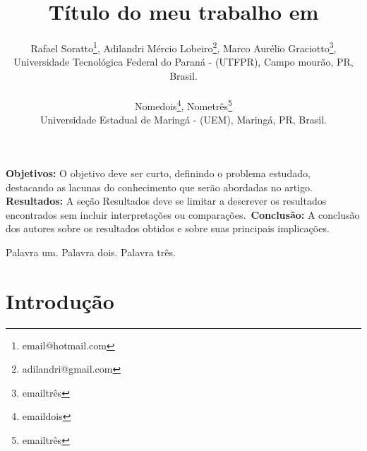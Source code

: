 \documentclass[a4,12pt]{modelo}
\newcommand{\objetivos}{O objetivo deve ser curto, definindo o problema estudado, destacando as lacunas do conhecimento que serão abordadas no artigo.}
\newcommand{\resultados}{ A seção Resultados deve se limitar a descrever os resultados encontrados sem incluir interpretações ou comparações.}
\newcommand{\conclusao}{A conclusão dos autores sobre os resultados obtidos e sobre suas principais implicações.}
\newcommand{\palavraschave}{Palavra um. Palavra dois. Palavra três.}
\begin{document}
 	
\title{Título do meu trabalho em \LaTeXe}
 
  	 
\author{  
 

\large{Rafael Soratto}\thanks{email@hotmail.com},  
\large{Adilandri Mércio Lobeiro}\thanks{adilandri@gmail.com},  
\large{Marco Aurélio Graciotto}\thanks{emailtrês},   

 
\small{ Universidade Tecnológica Federal do Paraná - (UTFPR), Campo mourão, PR, Brasil. \\}  
 
 
\large{Nomedois}\thanks{emaildois},  
\large{Nometrês}\thanks{emailtrês}  

	  

\small{Universidade Estadual de Maringá - (UEM), Maringá, PR,   Brasil. \\}       
			 
} 
  


\criartitulo  
\thispagestyle{sei}  


\begin{resumo}   
\parindent 0pt	
\textbf{Objetivos:} \objetivos \
\textbf{Resultados:} \resultados \
\textbf{Conclusão:} \conclusao
\end{resumo}  
	
\begin{keywords} 
 \palavraschave
\end{keywords} 


 
 
 
\section{Introdução}  
\end{document}
